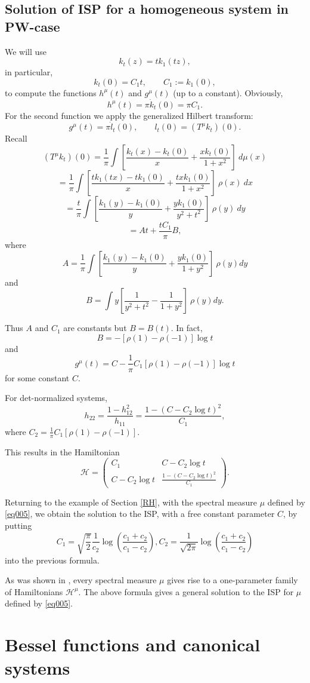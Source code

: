 \documentclass[11pt,twoside,reqno]{amsart}
\def\ms{\bigskip}
\def\ms{\medskip}
\def\no{\noindent}
\def\C{{\mathbb{C}}}
\def\HH{{\mathcal H}}
\theoremstyle{plain}
\numberwithin{equation}{section}
\begin{document}
\ms\subsection{Solution of ISP for a homogeneous system in PW-case} We will use 
$$k_t(z)=tk_1(tz),$$
in particular,
$$k_t(0)=C_1t,\qquad C_1:=k_1(0),$$
to compute the functions $h^\mu(t)$ and  $g^\mu(t)$ (up to a constant). Obviously,
$$h^\mu(t)=\pi\dot k_t(0)=\pi C_1.$$
For the second function we apply the generalized Hilbert transform:
$$g^\mu(t)=\pi \dot l_t(0),\qquad l_t(0)=(T^\mu k_t)(0).$$ 
Recall
$$(T^\mu k_t)(0)=\frac1\pi\int\left[ \frac{k_t(x)-k_t(0)}x+\frac{xk_t(0)}{1+x^2} \right]   ~d\mu(x)$$
$$=\frac1\pi\int\left[ \frac{tk_1(tx)-tk_1(0)}x+\frac{txk_1(0)}{1+x^2} \right]   ~\rho(x)~dx$$
$$=\frac t\pi\int\left[ \frac{k_1(y)-k_1(0)}y+\frac{yk_1(0)}{y^2+t^2} \right]   ~\rho(y)~dy$$$$= At+\frac{ tC_1}\pi B,$$
where
$$A=\frac 1\pi\int\left[ \frac{k_1(y)-k_1(0)}y+\frac{yk_1(0)}{1+y^2} \right] ~\rho(y)dy$$
and
$$B=\int y\left[\frac1{y^2+t^2}-\frac1{1+y^2}\right]~\rho(y)dy.$$

\ms\no Thus $A$ and $C_1$ are constants but $B=B(t)$. In fact,
$$B=-\left[\rho(1)-\rho(-1)\right]\log t$$
and
$$g^\mu(t)=C-\frac 1\pi C_1\left[\rho(1)-\rho(-1)\right]\log t$$
for some constant $C$. 

For det-normalized systems, $$h_{22}=\frac{1-h_{12}^2}{h_{11}}=\frac{1-(C-C_2\log t)^2}{C_1},$$
where $C_2=\frac 1\pi C_1\left[\rho(1)-\rho(-1)\right]$.

This results in the Hamiltonian
$$\HH=\begin{pmatrix} C_1& C-C_2\log t\\C-C_2\log t&\frac{1-(C-C_2\log t)^2}{C_1}\end{pmatrix}.$$

Returning to the example of Section \ref{RH}, with the spectral measure $\mu$ defined by \eqref{eq005}, we obtain
the solution to the ISP, with a free  constant parameter $C$, by putting
$$C_1= \sqrt{\frac\pi 2}\frac 1{c_2}\log\left(\frac{c_1+c_2}{c_1-c_2}\right), C_2= \frac1{\sqrt{2\pi}}\log\left(\frac{c_1+c_2}{c_1-c_2}\right)$$
into the previous formula.

As was shown in \cite{etudes}, every spectral measure $\mu$ gives rise to a one-parameter family of Hamiltonians $\HH^\mu$. 
The above formula gives a general solution to the ISP  for $\mu$ defined by \eqref{eq005}.


\ms\section{Bessel functions and canonical systems} 
\end{document}
